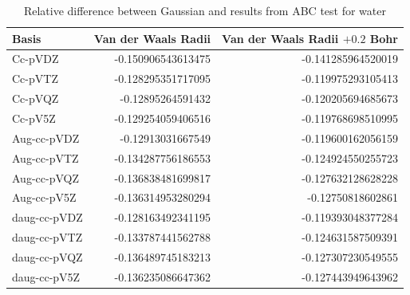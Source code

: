 \documentclass[../master_thesis.tex]{subfiles}
\begin{document}
\begin{table}[htbp]
\caption{Relative difference between Gaussian and \mrchem results from \ac{ABC}  test for water}
\begin{tabular}{|l|r|r|}
\hline
Basis & \multicolumn{1}{l|}{Van der Waals Radii} & \multicolumn{1}{l|}{Van der Waals Radii $+ 0.2$ Bohr} \\ \hline
Cc-pVDZ & -0.150906543613475 & -0.141285964520019 \\ \hline
Cc-pVTZ & -0.128295351717095 & -0.119975293105413 \\ \hline
Cc-pVQZ & -0.12895264591432 & -0.120205694685673 \\ \hline
Cc-pV5Z & -0.129254059406516 & -0.119768698510995 \\ \hline
Aug-cc-pVDZ & -0.12913031667549 & -0.119600162056159 \\ \hline
Aug-cc-pVTZ & -0.134287756186553 & -0.124924550255723 \\ \hline
Aug-cc-pVQZ & -0.136838481699817 & -0.127632128628228 \\ \hline
Aug-cc-pV5Z & -0.136314953280294 & -0.12750818602861 \\ \hline
daug-cc-pVDZ & -0.128163492341195 & -0.119393048377284 \\ \hline
daug-cc-pVTZ & -0.133787441562788 & -0.124631587509391 \\ \hline
daug-cc-pVQZ & -0.136489745183213 & -0.127307230549555 \\ \hline
daug-cc-pV5Z & -0.136235086647362 & -0.127443949643962 \\ \hline
\end{tabular}
\label{tab:watabcreldiff}
\end{table}
\end{document}
